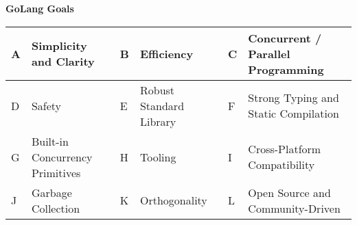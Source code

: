 \documentclass[12pt, addpoints, answers]{exam}
\newif\ifprintanswers
\newcommand{\fillin}[1]{%
  \ifprintanswers
    \textbf{#1}%
  \else
    \underline{\hspace{2mm}}%
  \fi
}
\begin{document}
\begin{questions}
				

				
				
\newpage 
\LARGE 
\hspace{-1.3cm}
\textbf{GoLang Goals}\\
\normalsize 

\begin{table}[ht]
\centering
\small
\setlength{\tabcolsep}{5pt} %
\renewcommand{\arraystretch}{1.5} %
\begin{tabular}{|m{0.4cm}|m{4cm}|m{0.4cm}|m{4cm}|m{0.4cm}|m{4cm}|}
\hline
A & Simplicity and Clarity & B & Efficiency & C & Concurrent / Parallel Programming \\ \hline
D & Safety & E & Robust Standard Library & F & Strong Typing and Static Compilation \\ \hline
G & Built-in Concurrency Primitives & H & Tooling & I & Cross-Platform Compatibility \\ \hline
J & Garbage Collection & K & Orthogonality & L & Open Source and Community-Driven \\ \hline
\end{tabular}
\end{table}

	\vspace{2mm} %
				

\end{questions}
\end{document}
